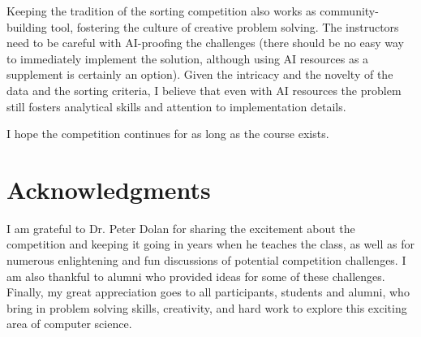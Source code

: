\documentclass[12pt]{article}
\begin{document}
Keeping the tradition of the sorting competition also works as community-building tool, fostering the culture of creative problem solving. The instructors need to be careful with AI-proofing the challenges (there should be no easy way to immediately implement the solution, although using AI resources as a supplement is certainly an option). Given the intricacy and the novelty of the data and the sorting criteria, I believe that even with AI resources the problem still fosters analytical skills and attention to implementation details. 

I hope the competition continues for as long as the course exists. 

\section{Acknowledgments}\label{sec:ack}
I am grateful to Dr. Peter Dolan for sharing the excitement about the competition and keeping it going in years when he teaches the class, as well as for numerous enlightening and fun discussions of potential competition challenges. I am also thankful to alumni who provided ideas for some of these challenges. Finally, my great appreciation goes to all participants, students and alumni, who bring in problem solving skills, creativity, and hard work to explore this exciting area of computer science.  




\end{document}
